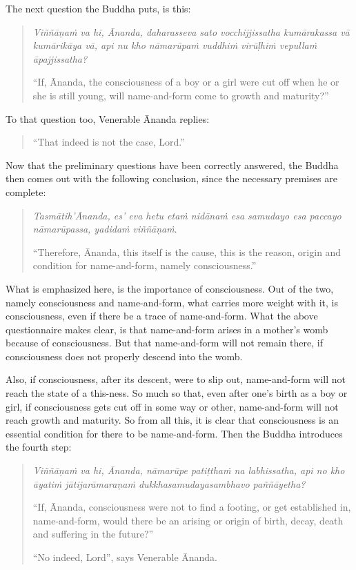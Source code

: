 The next question the Buddha puts, is this:

\begin{quote}
\emph{Viññāṇaṁ va hi, Ānanda, daharasseva sato vocchijjissatha kumārakassa vā kumārikāya vā, api nu kho nāmarūpaṁ vuddhiṁ virūḷhiṁ vepullaṁ āpajjissatha?}

``If, Ānanda, the consciousness of a boy or a girl were cut off when he or she is still young, will name-and-form come to growth and maturity?''
\end{quote}

To that question too, Venerable Ānanda replies:

\begin{quote}
``That indeed is not the case, Lord.''
\end{quote}

Now that the preliminary questions have been correctly answered, the Buddha then comes out with the following conclusion, since the necessary premises are complete:

\begin{quote}
\emph{Tasmātih'Ānanda, es' eva hetu etaṁ nidānaṁ esa samudayo esa paccayo nāmarūpassa, yadidaṁ viññāṇaṁ}.

``Therefore, Ānanda, this itself is the cause, this is the reason, origin and condition for name-and-form, namely consciousness.''
\end{quote}

What is emphasized here, is the importance of consciousness. Out of the two, namely consciousness and name-and-form, what carries more weight with it, is consciousness, even if there be a trace of name-and-form. What the above questionnaire makes clear, is that name-and-form arises in a mother's womb because of consciousness. But that name-and-form will not remain there, if consciousness does not properly descend into the womb.

Also, if consciousness, after its descent, were to slip out, name-and-form will not reach the state of a this-ness. So much so that, even after one's birth as a boy or girl, if consciousness gets cut off in some way or other, name-and-form will not reach growth and maturity. So from all this, it is clear that consciousness is an essential condition for there to be name-and-form. Then the Buddha introduces the fourth step:

\begin{quote}
\emph{Viññāṇaṁ va hi, Ānanda, nāmarūpe patiṭthaṁ na labhissatha, api no kho āyatiṁ jātijarāmaraṇaṁ dukkhasamudayasambhavo paññāyetha?}

``If, Ānanda, consciousness were not to find a footing, or get established in, name-and-form, would there be an arising or origin of birth, decay, death and suffering in the future?''

``No indeed, Lord'', says Venerable Ānanda.
\end{quote}


